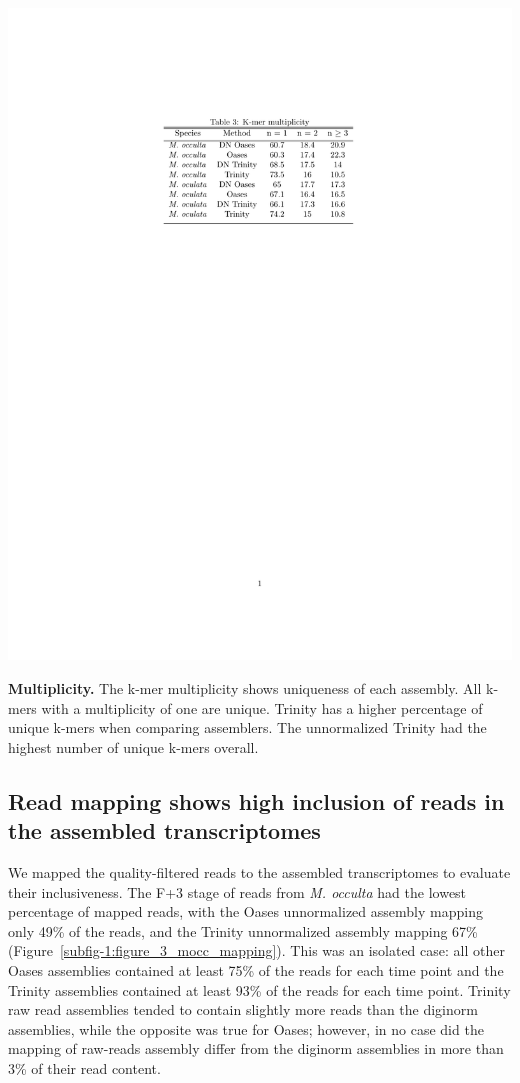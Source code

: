 \begin{table}[tbp]
\centering
\includegraphics[scale=1]{manuscript/Table_3_multiplicity.pdf}
\caption{\textbf{Multiplicity.} The k-mer multiplicity shows uniqueness of each assembly. All k-mers with a multiplicity of one are unique. Trinity has a higher percentage of unique k-mers when comparing assemblers. The unnormalized Trinity had the highest number of unique k-mers overall.}
\label{fig:multiplicity}
\end{table}

\subsection{Read mapping shows high inclusion of reads in the assembled transcriptomes}
	We mapped the quality-filtered reads to the assembled transcriptomes to evaluate their inclusiveness. The F+3 stage of reads from \textit{M. occulta} had the lowest percentage of mapped reads, with the Oases unnormalized assembly mapping only 49\% of the reads, and the Trinity unnormalized assembly mapping 67\% (Figure~\ref{subfig-1:figure_3_mocc_mapping}). This was an isolated case: all other Oases assemblies contained at least 75\% of the reads for each time point and the Trinity assemblies contained at least 93\% of the reads for each time point. Trinity raw read assemblies tended to contain slightly more reads than the diginorm assemblies, while the opposite was true for Oases; however, in no case did the mapping of raw-reads assembly differ from the diginorm assemblies in more than 3\% of their read content.
\setcounter{subfigure}{0}
	
